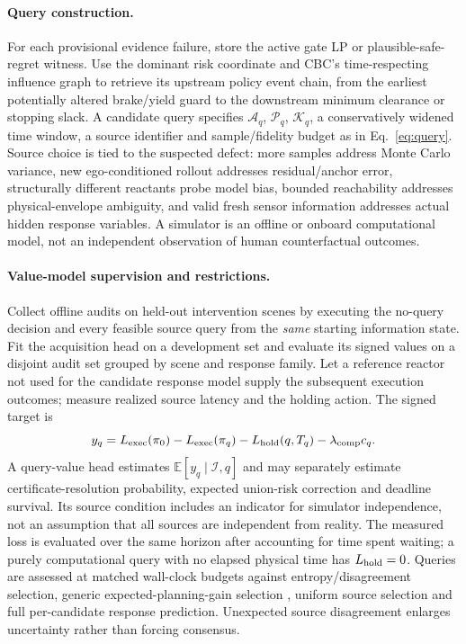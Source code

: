 \documentclass[10pt]{article}
\begin{document}
\paragraph{Query construction.}
For each provisional evidence failure, store the active gate LP or plausible-safe-regret witness. Use the dominant risk coordinate and CBC's time-respecting influence graph to retrieve its upstream policy event chain, from the earliest potentially altered brake/yield guard to the downstream minimum clearance or stopping slack. A candidate query specifies $\mathcal A_q$, $\mathcal P_q$, $\mathcal K_q$, a conservatively widened time window, a source identifier and sample/fidelity budget as in Eq.~\eqref{eq:query}. Source choice is tied to the suspected defect: more samples address Monte Carlo variance, new ego-conditioned rollout addresses residual/anchor error, structurally different reactants probe model bias, bounded reachability addresses physical-envelope ambiguity, and valid fresh sensor information addresses actual hidden response variables. A simulator is an offline or onboard computational model, not an independent observation of human counterfactual outcomes.

\paragraph{Value-model supervision and restrictions.}
Collect offline audits on held-out intervention scenes by executing the no-query decision and every feasible source query from the \emph{same} starting information state. Fit the acquisition head on a development set and evaluate its signed values on a disjoint audit set grouped by scene and response family. Let a reference reactor not used for the candidate response model supply the subsequent execution outcomes; measure realized source latency and the holding action. The signed target is
\begin{equation}
 y_q=L_{\rm exec}(\pi_0)-L_{\rm exec}(\pi_q)
 -L_{\rm hold}(q,T_q)-\lambda_{\rm comp}c_q.
 \label{eq:querytarget}
\end{equation}
A query-value head estimates $\mathbb E[y_q\mid\mathscr I,q]$ and may separately estimate certificate-resolution probability, expected union-risk correction and deadline survival. Its source condition includes an indicator for simulator independence, not an assumption that all sources are independent from reality. The measured loss is evaluated over the same horizon after accounting for time spent waiting; a purely computational query with no elapsed physical time has $L_{\rm hold}=0$. Queries are assessed at matched wall-clock budgets against entropy/disagreement selection, generic expected-planning-gain selection \parencite{chen2026not}, uniform source selection and full per-candidate response prediction. Unexpected source disagreement enlarges uncertainty rather than forcing consensus.
\end{document}
